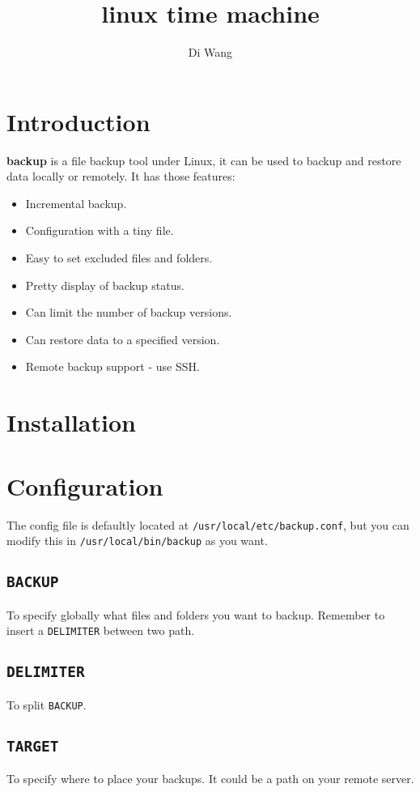 \documentclass[a4paper]{article}
\author{Di Wang}
\begin{document}
\title{linux time machine}
\maketitle

\tableofcontents

\section{Introduction}
\textbf{backup} is a file backup tool under Linux, it can be used to backup and restore data locally or remotely. It has those features:
\begin{itemize}
    \item Incremental backup.
    \item Configuration with a tiny file.
    \item Easy to set excluded files and folders.
    \item Pretty display of backup status.
    \item Can limit the number of backup versions.
    \item Can restore data to a specified version.
    \item Remote backup support - use SSH.
\end{itemize}

\section{Installation}

\section{Configuration}
The config file is defaultly located at {\large\tt /usr/local/etc/backup.conf}, but you can modify this in {\large\tt /usr/local/bin/backup} as you want.

\subsection{{\large\tt BACKUP}}
To specify globally what files and folders you want to backup. Remember to insert a {\large\tt DELIMITER} between two path.

\subsection{{\large\tt DELIMITER}}
To split {\large\tt BACKUP}.

\subsection{{\large\tt TARGET}}
To specify where to place your backups. It could be a path on your remote server.
\end{document}
